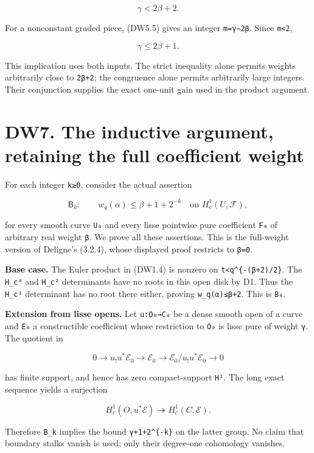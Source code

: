 \documentclass[
]{report}
\begin{document}
\[
\gamma<2\beta+2.
\tag{DW6.1}
\]

For a nonconstant graded piece, (DW5.5) gives an integer
\texttt{m=γ−2β}. Since \texttt{m\textless{}2},

\[
\gamma\le2\beta+1.
\tag{DW6.2}
\]

This implication uses both inputs. The strict inequality alone permits
weights arbitrarily close to \texttt{2β+2}; the congruence alone permits
arbitrarily large integers. Their conjunction supplies the exact
one-unit gain used in the product argument.

\section{DW7. The inductive argument, retaining the full coefficient
weight}\label{dw7.-the-inductive-argument-retaining-the-full-coefficient-weight}

For each integer \texttt{k≥0}, consider the actual assertion

\[
\mathsf B_k:\qquad
w_q(\alpha)\le\beta+1+2^{-k}
\quad\text{on }H_c^1(U,\mathcal F),
\tag{DW7.1}
\]

for every smooth curve \texttt{U₀} and every lisse pointwise pure
coefficient \texttt{F₀} of arbitrary real weight \texttt{β}. We prove
all these assertions. This is the full-weight version of Deligne's
(3.2.4), whose displayed proof restricts to \texttt{β=0}.

\textbf{Base case.} The Euler product in (DW1.4) is nonzero on
\texttt{\textbar{}t\textbar{}\textless{}q\^{}\{-(β+2)/2\}}. The
\texttt{H\_c⁰} and \texttt{H\_c²} determinants have no roots in this
open disk by D1. Thus the \texttt{H\_c¹} determinant has no root there
either, proving \texttt{w\_q(α)≤β+2}. This is \texttt{B₀}.

\textbf{Extension from lisse opens.} Let \texttt{u:O₀→C₀} be a dense
smooth open of a curve and \texttt{E₀} a constructible coefficient whose
restriction to \texttt{O₀} is lisse pure of weight \texttt{γ}. The
quotient in

\[
0\to u_!u^*\mathcal E_0\to\mathcal E_0
\to\mathcal E_0/u_!u^*\mathcal E_0\to0
\tag{DW7.2}
\]

has finite support, and hence has zero compact-support \texttt{H¹}. The
long exact sequence yields a surjection

\[
H_c^1(O,u^*\mathcal E)\twoheadrightarrow H_c^1(C,\mathcal E).
\tag{DW7.3}
\]

Therefore \texttt{B\_k} implies the bound \texttt{γ+1+2\^{}\{-k\}} on
the latter group. No claim that boundary stalks vanish is used; only
their degree-one cohomology vanishes.
\end{document}
